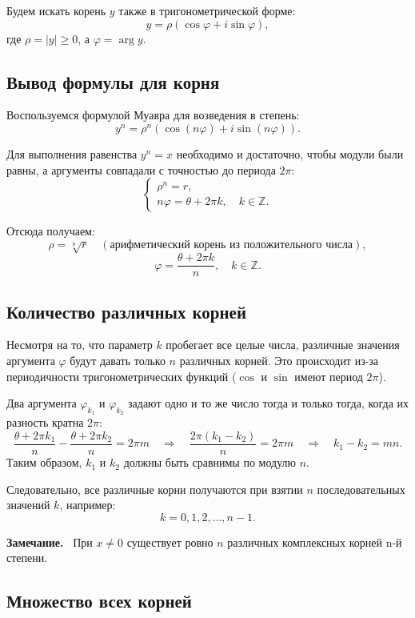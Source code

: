 \documentclass[a4paper,12pt]{article}
\newcommand{\myremark}{\textbf{Замечание.}\ }
\theoremstyle{definition}
\theoremstyle{plain}
\theoremstyle{remark}
\begin{document}
	Будем искать корень \( y \) также в тригонометрической форме:
	\[
	y = \rho(\cos \varphi + i \sin \varphi),
	\]
	где \( \rho = |y| \geq 0 \), а \( \varphi = \arg y \).
	
	\subsection{Вывод формулы для корня}
	
	Воспользуемся формулой Муавра для возведения в степень:
	\[
	y^n = \rho^n (\cos (n\varphi) + i \sin (n\varphi)).
	\]
	
	Для выполнения равенства \( y^n = x \) необходимо и достаточно, чтобы модули были равны, а аргументы совпадали с точностью до периода \( 2\pi \):
	\[
	\begin{cases}
		\rho^n = r, \\
		n\varphi = \theta + 2\pi k, \quad k \in \mathbb{Z}.
	\end{cases}
	\]
	
	Отсюда получаем:
	\[
	\rho = \sqrt[n]{r} \quad (\text{арифметический корень из положительного числа}),
	\]
	\[
	\varphi = \frac{\theta + 2\pi k}{n}, \quad k \in \mathbb{Z}.
	\]
	
	\subsection{Количество различных корней}
	
	Несмотря на то, что параметр \( k \) пробегает все целые числа, различные значения аргумента \( \varphi \) будут давать только \( n \) различных корней. Это происходит из-за периодичности тригонометрических функций (\( \cos \) и \( \sin \) имеют период \( 2\pi \)).
	
	Два аргумента \( \varphi_{k_1} \) и \( \varphi_{k_2} \) задают одно и то же число тогда и только тогда, когда их разность кратна \( 2\pi \):
	\[
	\frac{\theta + 2\pi k_1}{n} - \frac{\theta + 2\pi k_2}{n} = 2\pi m \quad \Rightarrow \quad \frac{2\pi (k_1 - k_2)}{n} = 2\pi m \quad \Rightarrow \quad k_1 - k_2 = m n.
	\]
	Таким образом, \( k_1 \) и \( k_2 \) должны быть сравнимы по модулю \( n \).
	
	\medskip
	Следовательно, все различные корни получаются при взятии \( n \) последовательных значений \( k \), например:
	\[
	k = 0, 1, 2, \dots, n-1.
	\]
	
	\myremark
	При \( x \neq 0 \) существует ровно \( n \) различных комплексных корней n-й степени.
	
	\subsection{Множество всех корней}
	
\end{document}
